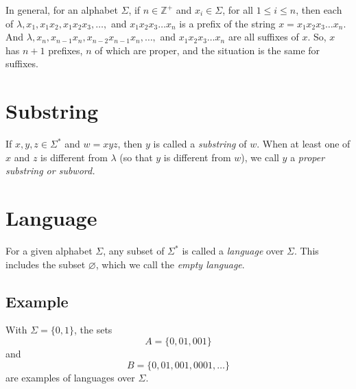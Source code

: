 \documentclass[11pt]{article}
\let\emptyset\varnothing
\begin{document}
    \vspace{1em}

    In general, for an alphabet \(\Sigma\), if \(n \in \mathbb{Z}^+\) and \(x_i \in \Sigma\), for all \( 1 \leq i \leq n \), then each of \(\lambda, x_1, x_1x_2, x_1 x_2 x_3, \dots,\) and \(x_1 x_2 x_3 \dots x_n\) is a prefix of the string \( x = x_1 x_2 x_3 \dots x_n \). And \(\lambda, x_n, x_{n-1} x_n, x_{n-2} x_{n-1} x_n, \dots,\) and \( x_1 x_2 x_3 \dots x_n \) are all suffixes of $x$. So, $x$ has \(n+1\) prefixes, $n$ of which are proper, and the situation is the same for suffixes.

    \section{Substring}

    If \(x,y,z \in \Sigma^*\) and \(w = xyz\), then $y$ is called a \emph{substring} of $w$. When at least one of $x$ and $z$ is different from \(\lambda\) (so that $y$ is different from $w$), we call $y$ a \emph{proper substring or subword.}

    \section{Language}

    For a given alphabet \(\Sigma\), any subset of \( \Sigma^* \) is called a \emph{language} over \(\Sigma\). This includes the subset \(\emptyset\), which we call the \emph{empty language}.

    \subsection{Example}

    With \( \Sigma = \{0,1\} \), the sets \[A = \{0,01,001\}\] and \[ B = \{0,01,001,0001, \dots\} \] are examples of languages over \(\Sigma\).
\end{document}
